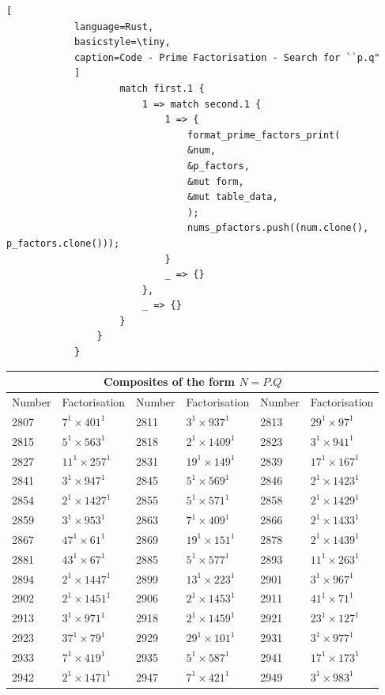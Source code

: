 \documentclass[11pt,a4paper]{article}
\begin{document}
\begin{enumerate}[1.]
\begin{flushleft}
\begin{lstlisting}[
			language=Rust, 
			basicstyle=\tiny, 
			caption=Code - Prime Factorisation - Search for ``p.q"  
			]
					match first.1 {
						1 => match second.1 {
							1 => {
								format_prime_factors_print(
								&num,
								&p_factors,
								&mut form,
								&mut table_data,
								);
								nums_pfactors.push((num.clone(), p_factors.clone()));
							}
							_ => {}
						},
						_ => {}
					}
				}
			}
			\end{lstlisting}
			
			\begin{table}[H]
				\begin{adjustbox}{scale=0.9,center}
			\begin{tabular}{ ||p{2cm}|p{2cm}||p{2cm}|p{2cm}||p{2cm}|p{2cm}|| }
				\hline
				\multicolumn{6}{|c|}{Composites of the form $N = P.Q$} \\
				\hline
				Number & Factorisation & Number & Factorisation & Number & Factorisation\\
				\hline
				2807 & $7^1 \times 401^1$ & 2811 & $3^1 \times 937^1$ & 2813 & $29^1 \times 97^1$ \\
				2815 & $5^1 \times 563^1$ & 2818 & $2^1 \times 1409^1$&2823  & $3^1 \times 941^1$ \\
				2827 & $11^1 \times 257^1$& 2831 & $19^1 \times 149^1$&2839  & $17^1 \times 167^1$\\
				2841 & $3^1 \times 947^1$&2845 & $5^1 \times 569^1$&2846 & $2^1 \times 1423^1$ \\
				2854 & $2^1 \times 1427^1$&2855 & $5^1 \times 571^1$&2858 & $2^1 \times 1429^1$\\
				2859 & $3^1 \times 953^1$&2863 & $7^1 \times 409^1$&2866 & $2^1 \times 1433^1$\\
				2867 & $47^1 \times 61^1$&2869 & $19^1 \times 151^1$&2878 & $2^1 \times 1439^1$\\
				2881 & $43^1 \times 67^1$&2885 & $5^1 \times 577^1$&2893 & $11^1 \times 263^1$\\
				2894 & $2^1 \times 1447^1$&2899 & $13^1 \times 223^1$&2901 & $3^1 \times 967^1$\\
				2902 & $2^1 \times 1451^1$&2906 & $2^1 \times 1453^1$&2911 & $41^1 \times 71^1$\\
				2913 & $3^1 \times 971^1$&2918 & $2^1 \times 1459^1$&2921 & $23^1 \times 127^1$\\
				2923 & $37^1 \times 79^1$&2929 & $29^1 \times 101^1$&2931 & $3^1 \times 977^1$\\
				2933 & $7^1 \times 419^1$&2935 & $5^1 \times 587^1$&2941 & $17^1 \times 173^1$\\
				2942 & $2^1 \times 1471^1$&2947 & $7^1 \times 421^1$&2949 & $3^1 \times 983^1$\\

\end{tabular}
\end{adjustbox}
\end{table}
\end{flushleft}
\end{enumerate}
\end{document}
